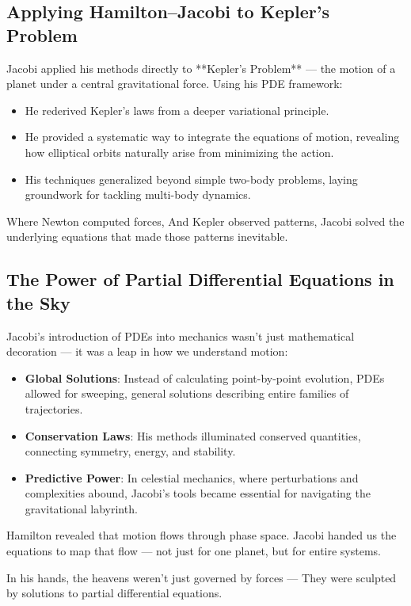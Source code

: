 \subsection{Applying Hamilton–Jacobi to Kepler’s Problem}

Jacobi applied his methods directly to **Kepler’s Problem** — the motion of a planet under a central gravitational force. Using his PDE framework:

\begin{itemize}
  \item He rederived Kepler’s laws from a deeper variational principle.
  \item He provided a systematic way to integrate the equations of motion, revealing how elliptical orbits naturally arise from minimizing the action.
  \item His techniques generalized beyond simple two-body problems, laying groundwork for tackling multi-body dynamics.
\end{itemize}

Where Newton computed forces,  
And Kepler observed patterns,  
Jacobi solved the underlying equations that made those patterns inevitable.

\subsection{The Power of Partial Differential Equations in the Sky}

Jacobi’s introduction of PDEs into mechanics wasn’t just mathematical decoration — it was a leap in how we understand motion:

\begin{itemize}
  \item \textbf{Global Solutions}: Instead of calculating point-by-point evolution, PDEs allowed for sweeping, general solutions describing entire families of trajectories.
  \item \textbf{Conservation Laws}: His methods illuminated conserved quantities, connecting symmetry, energy, and stability.
  \item \textbf{Predictive Power}: In celestial mechanics, where perturbations and complexities abound, Jacobi’s tools became essential for navigating the gravitational labyrinth.
\end{itemize}

\begin{tcolorbox}[colback=blue!5!white, colframe=blue!50!black, title={Jacobi’s Legacy: When PDEs Charted the Cosmos}]
Hamilton revealed that motion flows through phase space.  
Jacobi handed us the equations to map that flow — not just for one planet, but for entire systems.

In his hands, the heavens weren’t just governed by forces —  
They were sculpted by solutions to partial differential equations.
\end{tcolorbox}

